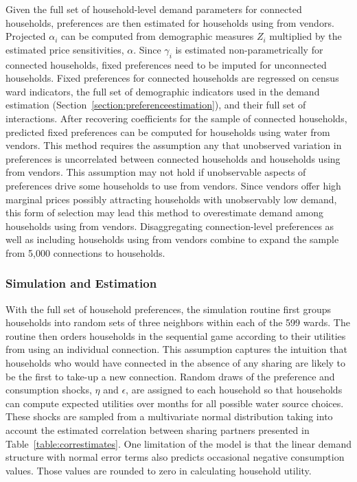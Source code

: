 \documentclass[12pt]{article}
\begin{document}
Given the full set of household-level demand parameters for connected households, preferences are then estimated for households using from vendors.  Projected $\alpha_i$ can be computed from demographic measures $Z_i$ multiplied by the estimated price sensitivities, $\alpha$.  Since $\gamma_i$ is estimated non-parametrically for connected households, fixed preferences need to be imputed for unconnected households.  Fixed preferences for connected households are regressed on census ward indicators, the full set of demographic indicators used in the demand estimation (Section~\ref{section:preferenceestimation}), and their full set of interactions.   After recovering coefficients for the sample of connected households, predicted fixed preferences can be computed for households using water from vendors.  This method requires the assumption any that unobserved variation in preferences is uncorrelated between connected households and households using from vendors.  This assumption may not hold if unobservable aspects of preferences drive some households to use from vendors.  Since vendors offer high marginal prices possibly attracting households with unobservably low demand, this form of selection may lead this method to overestimate demand among households using from vendors.  Disaggregating connection-level preferences as well as including households using from vendors combine to expand the sample from 5,000 connections to households.  

\subsubsection{Simulation and Estimation}

With the full set of household preferences, the simulation routine first groups households into random sets of three neighbors within each of the 599 wards.  The routine then orders households in the sequential game according to their utilities from using an individual connection.  This assumption captures the intuition that households who would have connected in the absence of any sharing are likely to be the first to take-up a new connection.  Random draws of the preference and consumption shocks, $\eta$ and $\epsilon$, are assigned to each household so that households can compute expected utilities over months for all possible water source choices.  These shocks are sampled from a multivariate normal distribution taking into account the estimated correlation between sharing partners presented in Table~\ref{table:correstimates}.  One limitation of the model is that the linear demand structure with normal error terms also predicts occasional negative consumption values.  Those values are rounded to zero in calculating household utility.
\end{document}
